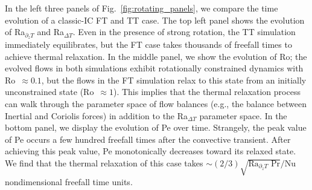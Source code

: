 \documentclass[aps, pre, onecolumn, nofootinbib, notitlepage, groupedaddress, amsfonts, amssymb, amsmath, longbibliography, superscriptaddress]{revtex4-1}
\begin{document}
In the left three panels of Fig.~\ref{fig:rotating_panels}, we compare the time evolution of a classic-IC FT and TT case.
The top left panel shows the evolution of Ra$_{\partial_z T}$ and Ra$_{\Delta T}$.
Even in the presence of strong rotation, the TT simulation immediately equilibrates, but the FT case takes thousands of freefall times to achieve thermal relaxation.
In the middle panel, we show the evolution of Ro; the evolved flows in both simulations exhibit rotationally constrained dynamics with Ro $\,\approx 0.1$, but the flows in the FT simulation relax to this state from an initially unconstrained state (Ro $\,\approx 1$).
This implies that the thermal relaxation process can walk through the parameter space of flow balances (e.g., the balance between Inertial and Coriolis forces) in addition to the Ra$_{\Delta T}$ parameter space.
In the bottom panel, we display the evolution of Pe over time.
Strangely, the peak value of Pe occurs a few hundred freefall times after the convective transient.
After achieving this peak value, Pe monotonically decreases toward its relaxed state.
We find that the thermal relaxation of this case takes $\sim (2/3)\sqrt{\text{Ra}_{\partial_z T}\text{ Pr}}/\text{Nu}$ nondimensional freefall time units.
\end{document}
